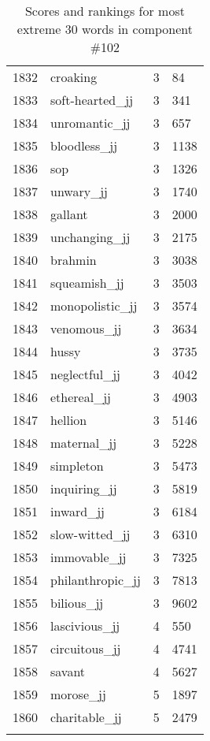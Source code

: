 \begin{longtable}[!htbp]{| rlr@{.}l |}
    1832 & croaking & 3 & 84 \\
    1833 & soft-hearted\_jj & 3 & 341 \\
    1834 & unromantic\_jj & 3 & 657 \\
    1835 & bloodless\_jj & 3 & 1138 \\
    1836 & sop & 3 & 1326 \\
    1837 & unwary\_jj & 3 & 1740 \\
    1838 & gallant & 3 & 2000 \\
    1839 & unchanging\_jj & 3 & 2175 \\
    1840 & brahmin & 3 & 3038 \\
    1841 & squeamish\_jj & 3 & 3503 \\
    1842 & monopolistic\_jj & 3 & 3574 \\
    1843 & venomous\_jj & 3 & 3634 \\
    1844 & hussy & 3 & 3735 \\
    1845 & neglectful\_jj & 3 & 4042 \\
    1846 & ethereal\_jj & 3 & 4903 \\
    1847 & hellion & 3 & 5146 \\
    1848 & maternal\_jj & 3 & 5228 \\
    1849 & simpleton & 3 & 5473 \\
    1850 & inquiring\_jj & 3 & 5819 \\
    1851 & inward\_jj & 3 & 6184 \\
    1852 & slow-witted\_jj & 3 & 6310 \\
    1853 & immovable\_jj & 3 & 7325 \\
    1854 & philanthropic\_jj & 3 & 7813 \\
    1855 & bilious\_jj & 3 & 9602 \\
    1856 & lascivious\_jj & 4 & 550 \\
    1857 & circuitous\_jj & 4 & 4741 \\
    1858 & savant & 4 & 5627 \\
    1859 & morose\_jj & 5 & 1897 \\
    1860 & charitable\_jj & 5 & 2479 \\
    \hline
    \caption{Scores and rankings for most extreme 30 words in component \#102} \\
\end{longtable}
